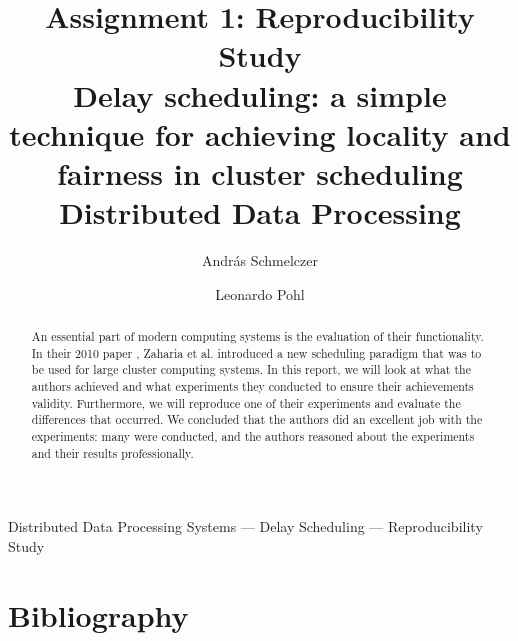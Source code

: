 \documentclass[14pt, times, twoside]{zHenriquesLab-StyleBioRxiv}
\begin{document}
%

\title{Assignment 1: Reproducibility Study\\\Large Delay scheduling: a simple technique for achieving locality and fairness in cluster scheduling\\\large Distributed Data Processing}
%
%
\author[1]{András Schmelczer}
\author[1]{Leonardo Pohl}


%
\maketitle              %

\begin{abstract}
    An essential part of modern computing systems is the evaluation of their functionality. In their 2010 paper \cite{ds}, Zaharia et al. introduced a new scheduling paradigm that was to be used for large cluster computing systems. In this report, we will look at what the authors achieved and what experiments they conducted to ensure their achievements validity. Furthermore, we will reproduce one of their experiments and evaluate the differences that occurred. We concluded that the authors did an excellent job with the experiments: many were conducted, and the authors reasoned about the experiments and their results professionally.
\end{abstract}

\begin{keywords}
Distributed Data Processing Systems --- Delay Scheduling --- Reproducibility Study
\end{keywords}









\section*{Bibliography}
% 



%
\end{document}
